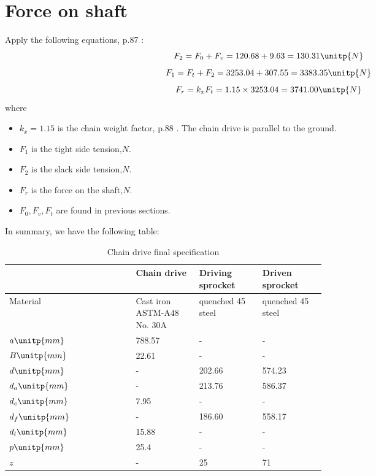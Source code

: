\section{Force on shaft}
Apply the following equations, p.87 \cite{tk1}:\\
\[ F_2 = F_0 + F_v = 120.68 + 9.63 = 130.31 \unitp{N}\]
\[ F_1 = F_t + F_2 = 3253.04 + 307.55 = 3383.35 \unitp{N}\]
\[F_r = k_xF_t = 1.15 \times 3253.04 = 3741.00\unitp{N}\]
where
\begin{itemize}
	\item $ k_x = 1.15 $ is the chain weight factor, p.88 \cite{tk1}. The chain drive is parallel to the ground.
	\item $ F_1 $ is the tight side tension,$ \unit{N} $.
	\item $ F_2 $ is the slack side tension,$ \unit{N} $.
	\item $ F_r $ is the force on the shaft,$ \unit{N} $.
	\item $ F_0,F_v,F_t $ are found in previous sections.
\end{itemize}

In summary, we have the following table:

\begin{table}[ht]
	\centering
	\caption{Chain drive final specification}
	\begin{tabular}{lp{0.2\linewidth}p{0.2\linewidth}p{0.2\linewidth}}\toprule
		& Chain drive & Driving sprocket & Driven sprocket \\ \midrule
		Material	&	Cast iron ASTM-A48 No. 30A	&	quenched 45 steel		&	quenched 45 steel		\\
		$ a\unitp{mm}    $	&	788.57	&	-		&	-		\\
		$ B\unitp{mm} $	&	22.61	&	-		&	-		\\
		$ d\unitp{mm} $	&	-		&	202.66	&	574.23	\\
		$ d_a\unitp{mm} $	&	-		&	213.76	&	586.37	\\
		$ d_c\unitp{mm}  $	&	7.95	&	-		&	-		\\
		$ d_f\unitp{mm}  $	&	-		&	186.60	&	558.17	\\
		$ d_l\unitp{mm}  $	&	15.88	&	-		&	-		\\
		$ p\unitp{mm}    $	&	25.4	&	-		&	-		\\
		$ z              $	&	-		&	25		&	71		\\\bottomrule
	\end{tabular}
\end{table}